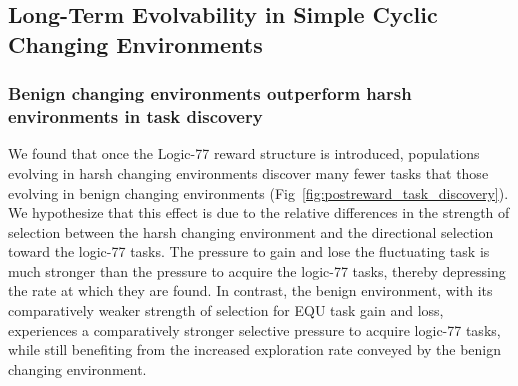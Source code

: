 \documentclass[PhD]{msu-thesis}
\begin{document}
\subsection{Long-Term Evolvability in Simple Cyclic Changing Environments}

\subsubsection{Benign changing environments outperform harsh environments in task discovery}
We found
that once the Logic-77 reward structure is introduced, populations evolving in harsh changing environments discover many fewer tasks that those evolving in benign changing environments (Fig~\ref{fig:postreward_task_discovery}). We hypothesize that this effect is due to the relative differences in the strength of selection between the harsh changing environment and the directional selection toward the logic-77 tasks.
The pressure to gain and lose the fluctuating task is much stronger than the pressure to acquire the logic-77 tasks, thereby depressing the rate at which they are found.
In contrast, the benign environment, with its comparatively weaker strength of selection for EQU task gain and loss, experiences a comparatively stronger selective pressure to acquire logic-77 tasks, while still benefiting from the increased exploration rate conveyed by the benign changing environment.
\end{document}
